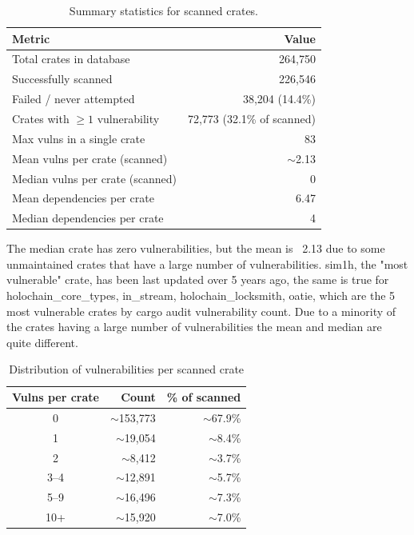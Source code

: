 \begin{table}[ht]
\centering
\caption{Summary statistics for scanned crates.}\label{tab:crate-summary}
\begin{tabular}{|l|r|}
\hline
\textbf{Metric} & \textbf{Value} \\
\hline
Total crates in database        & 264,750 \\
Successfully scanned            & 226,546 \\
Failed / never attempted        &  38,204 (14.4\%) \\
Crates with $\ge 1$ vulnerability &  72,773 (32.1\% of scanned) \\
Max vulns in a single crate     &      83 \\
Mean vulns per crate (scanned)  & $\sim$2.13 \\
Median vulns per crate (scanned)&       0 \\
Mean dependencies per crate     &    6.47 \\
Median dependencies per crate   &       4 \\
\hline
\end{tabular}
\end{table}

The median crate has zero vulnerabilities, but the mean is ~2.13 due to some unmaintained crates that have a large number of vulnerabilities.
sim1h, the "most vulnerable" crate, has been last updated over 5 years ago, the same is true for holochain\_core\_types, in\_stream, holochain\_locksmith, oatie, which are the 5 most vulnerable crates by cargo audit vulnerability count. Due to a minority of the crates having a large number of vulnerabilities the mean and median are quite different.

\begin{table}[ht]
\centering
\begin{tabular}{|c|r|r|}
\hline
\textbf{Vulns per crate} & \textbf{Count} & \textbf{\% of scanned} \\
\hline
0 & $\sim$153{,}773 & $\sim$67.9\% \\
\hline
1 & $\sim$19{,}054 & $\sim$8.4\% \\
\hline
2 & $\sim$8{,}412 & $\sim$3.7\% \\
\hline
3--4 & $\sim$12{,}891 & $\sim$5.7\% \\
\hline
5--9 & $\sim$16{,}496 & $\sim$7.3\% \\
\hline
10+ & $\sim$15{,}920 & $\sim$7.0\% \\
\hline
\end{tabular}
\caption{Distribution of vulnerabilities per scanned crate}
\label{tab:vuln-distribution}
\end{table}

